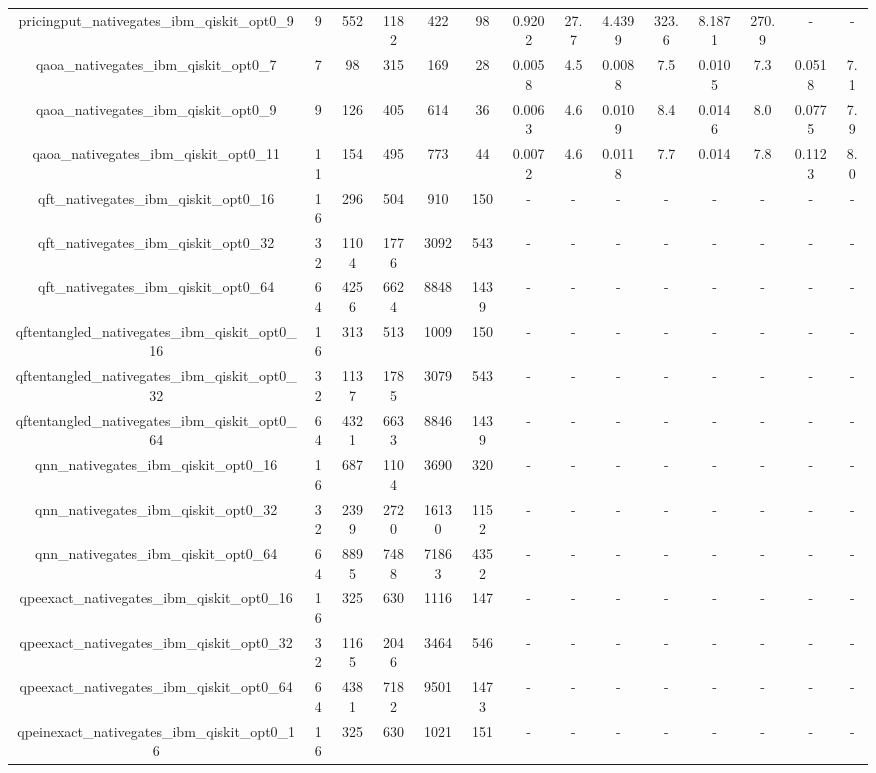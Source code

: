 \begin{table}[htb]
{\begin{tabular}{|c|c|c|c|c|c|c|c|c|c|c|c|c|c|}
pricingput\_nativegates\_ibm\_qiskit\_opt0\_9 & 9 & 552 & 1182 & 422 & 98 & 0.9202 & 27.7 & 4.4399 & 323.6 & 8.1871 & 270.9 & - & - \\ 
qaoa\_nativegates\_ibm\_qiskit\_opt0\_7 & 7 & 98 & 315 & 169 & 28 & 0.0058 & 4.5 & 0.0088 & 7.5 & 0.0105 & 7.3 & 0.0518 & 7.1 \\ 
qaoa\_nativegates\_ibm\_qiskit\_opt0\_9 & 9 & 126 & 405 & 614 & 36 & 0.0063 & 4.6 & 0.0109 & 8.4 & 0.0146 & 8.0 & 0.0775 & 7.9 \\ 
qaoa\_nativegates\_ibm\_qiskit\_opt0\_11 & 11 & 154 & 495 & 773 & 44 & 0.0072 & 4.6 & 0.0118 & 7.7 & 0.014 & 7.8 & 0.1123 & 8.0 \\ 
qft\_nativegates\_ibm\_qiskit\_opt0\_16 & 16 & 296 & 504 & 910 & 150 & - & - & - & - & - & - & - & - \\ 
qft\_nativegates\_ibm\_qiskit\_opt0\_32 & 32 & 1104 & 1776 & 3092 & 543 & - & - & - & - & - & - & - & - \\ 
qft\_nativegates\_ibm\_qiskit\_opt0\_64 & 64 & 4256 & 6624 & 8848 & 1439 & - & - & - & - & - & - & - & - \\ 
qftentangled\_nativegates\_ibm\_qiskit\_opt0\_16 & 16 & 313 & 513 & 1009 & 150 & - & - & - & - & - & - & - & - \\ 
qftentangled\_nativegates\_ibm\_qiskit\_opt0\_32 & 32 & 1137 & 1785 & 3079 & 543 & - & - & - & - & - & - & - & - \\ 
qftentangled\_nativegates\_ibm\_qiskit\_opt0\_64 & 64 & 4321 & 6633 & 8846 & 1439 & - & - & - & - & - & - & - & - \\ 
qnn\_nativegates\_ibm\_qiskit\_opt0\_16 & 16 & 687 & 1104 & 3690 & 320 & - & - & - & - & - & - & - & - \\ 
qnn\_nativegates\_ibm\_qiskit\_opt0\_32 & 32 & 2399 & 2720 & 16130 & 1152 & - & - & - & - & - & - & - & - \\ 
qnn\_nativegates\_ibm\_qiskit\_opt0\_64 & 64 & 8895 & 7488 & 71863 & 4352 & - & - & - & - & - & - & - & - \\ 
qpeexact\_nativegates\_ibm\_qiskit\_opt0\_16 & 16 & 325 & 630 & 1116 & 147 & - & - & - & - & - & - & - & - \\ 
qpeexact\_nativegates\_ibm\_qiskit\_opt0\_32 & 32 & 1165 & 2046 & 3464 & 546 & - & - & - & - & - & - & - & - \\ 
qpeexact\_nativegates\_ibm\_qiskit\_opt0\_64 & 64 & 4381 & 7182 & 9501 & 1473 & - & - & - & - & - & - & - & - \\ 
qpeinexact\_nativegates\_ibm\_qiskit\_opt0\_16 & 16 & 325 & 630 & 1021 & 151 & - & - & - & - & - & - & - & - \\ 

\end{tabular}}
\end{table}
